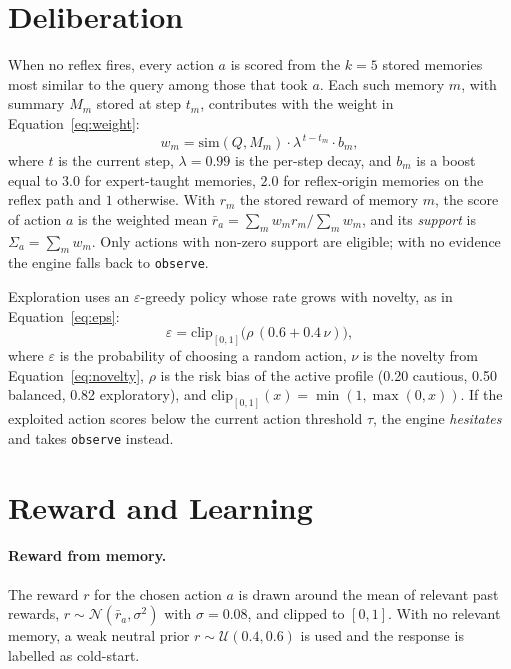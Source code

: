\documentclass[12pt,a4paper,oneside]{report}
\newcommand{\code}[1]{\texttt{\small #1}}
\begin{document}
\section{Deliberation}
When no reflex fires, every action $a$ is scored from the $k=5$ stored memories most similar to the query among those that took $a$. Each such memory $m$, with summary $M_m$ stored at step $t_m$, contributes with the weight in Equation~\eqref{eq:weight}:
\begin{equation}
  w_m = \mathrm{sim}(Q, M_m)\cdot \lambda^{\,t - t_m}\cdot b_m,
  \label{eq:weight}
\end{equation}
where $t$ is the current step, $\lambda = 0.99$ is the per-step decay, and $b_m$ is a boost equal to $3.0$ for expert-taught memories, $2.0$ for reflex-origin memories on the reflex path and $1$ otherwise. With $r_m$ the stored reward of memory $m$, the score of action $a$ is the weighted mean $\bar r_a = \sum_m w_m r_m / \sum_m w_m$, and its \emph{support} is $\Sigma_a = \sum_m w_m$. Only actions with non-zero support are eligible; with no evidence the engine falls back to \code{observe}.

Exploration uses an $\varepsilon$-greedy policy whose rate grows with novelty, as in Equation~\eqref{eq:eps}:
\begin{equation}
  \varepsilon = \mathrm{clip}_{[0,1]}\big(\rho\,(0.6 + 0.4\,\nu)\big),
  \label{eq:eps}
\end{equation}
where $\varepsilon$ is the probability of choosing a random action, $\nu$ is the novelty from Equation~\eqref{eq:novelty}, $\rho$ is the risk bias of the active profile (0.20 cautious, 0.50 balanced, 0.82 exploratory), and $\mathrm{clip}_{[0,1]}(x) = \min(1, \max(0, x))$. If the exploited action scores below the current action threshold $\tau$, the engine \emph{hesitates} and takes \code{observe} instead.

\section{Reward and Learning}
\paragraph{Reward from memory.} The reward $r$ for the chosen action $a$ is drawn around the mean of relevant past rewards, $r \sim \mathcal{N}(\bar r_a, \sigma^2)$ with $\sigma = 0.08$, and clipped to $[0,1]$. With no relevant memory, a weak neutral prior $r \sim \mathcal{U}(0.4, 0.6)$ is used and the response is labelled as cold-start.
\end{document}
